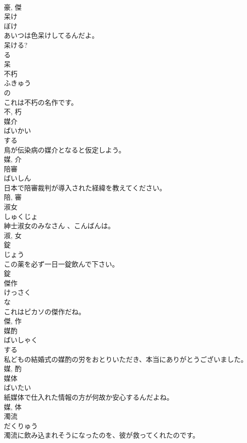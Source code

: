 \documentclass[8pt]{extreport}
\begin{document}
\begin{CJK}{UTF8}{min}
\\	豪, 傑	
\\	呆け	
\\	ぼけ	
\\	あいつは色呆けしてるんだよ。	
\\	呆ける? 
\\	る 
\\	呆	
\\	不朽	
\\	ふきゅう	
\\	の 
\\	これは不朽の名作です。	
\\	不, 朽	
\\	媒介	
\\	ばいかい	
\\	する 
\\	鳥が伝染病の媒介となると仮定しよう。	
\\	媒, 介	
\\	陪審	
\\	ばいしん	
\\	日本で陪審裁判が導入された経緯を教えてください。	
\\	陪, 審	
\\	淑女	
\\	しゅくじょ	
\\	紳士淑女のみなさん 、こんばんは。	
\\	淑, 女	
\\	錠	
\\	じょう	
\\	この薬を必ず一日一錠飲んで下さい。	
\\	錠	
\\	傑作	
\\	けっさく	
\\	な 
\\	これはピカソの傑作だね。	
\\	傑, 作	
\\	媒酌	
\\	ばいしゃく	
\\	する 
\\	私どもの結婚式の媒酌の労をおとりいただき、本当にありがとうございました。	
\\	媒, 酌	
\\	媒体	
\\	ばいたい	
\\	紙媒体で仕入れた情報の方が何故か安心するんだよね。	
\\	媒, 体	
\\	濁流	
\\	だくりゅう	
\\	濁流に飲み込まれそうになったのを、彼が救ってくれたのです。	

\end{CJK}
\end{document}
